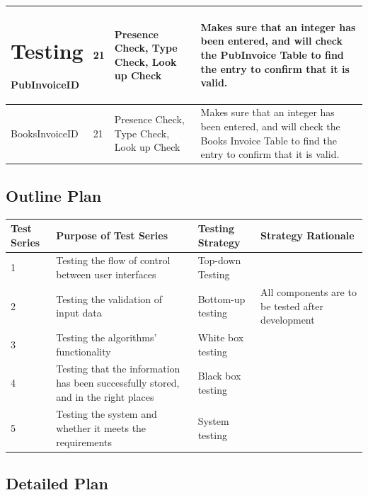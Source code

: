 \begin{center}
\begin{tabular}{|p{2cm}|p{2cm}|p{2cm}|p{2cm}|}
\section{Testing}
    PubInvoiceID & 21 & Presence Check, Type Check, Look up Check & Makes sure that an integer has been entered, and will check the PubInvoice Table to find the entry to confirm that it is valid. \\ \hline
    BooksInvoiceID & 21 & Presence Check, Type Check, Look up Check & Makes sure that an integer has been entered, and will check the Books Invoice Table to find the entry to confirm that it is valid. \\ \hline
\end{tabular}
\end{center}


\begin{landscape}
\subsection{Outline Plan}

\begin{center}
    \begin{tabular}{|p{2cm}|p{5cm}|p{5cm}|p{4cm}|}
        \hline
        \textbf{Test Series} & \textbf{Purpose of Test Series} & \textbf{Testing Strategy} & \textbf{Strategy Rationale}\\ \hline
        1 & Testing the flow of control between user interfaces & Top-down Testing & \\ \hline
        2 & Testing the validation of input data & Bottom-up testing & All components are to be tested after development \\ \hline
        3 & Testing the algorithms' functionality & White box testing & \\ \hline
        4 & Testing that the information has been successfully stored, and in the right places & Black box testing & \\ \hline
        5 & Testing the system and whether it meets the requirements & System testing & \\ \hline
    \end{tabular}
\end{center}

\subsection{Detailed Plan}


\end{landscape}
